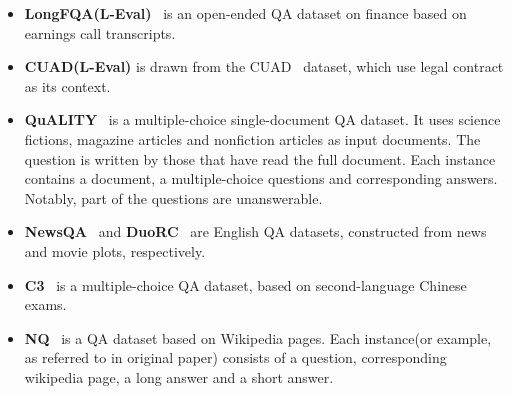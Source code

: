 \begin{itemize}[leftmargin=10pt]
    \item \textbf{LongFQA(L-Eval)}~\cite{an_l-eval:_2023} is an open-ended QA dataset on finance based on earnings call transcripts. 
    \item \textbf{CUAD(L-Eval)}\cite{an_l-eval:_2023} is drawn from the CUAD~\cite{hendrycks_cuad:_2021} dataset, which use legal contract as its context. 
    \item \textbf{QuALITY}~\cite{pang_quality_dataset:_2021} is a multiple-choice single-document QA dataset. It uses science fictions, magazine articles and nonfiction articles as input documents. The question is written by those that have read the full document. Each instance contains a document, a multiple-choice questions and corresponding answers. Notably, part of the questions are unanswerable. 
    \item \textbf{NewsQA}~\cite{kwan_m4le:_2023} and \textbf{DuoRC}~\cite{kwan_m4le:_2023} are English QA datasets, constructed from news and movie plots, respectively. 
    \item \textbf{C3}~\cite{kwan_m4le:_2023} is a multiple-choice QA dataset, based on second-language Chinese exams.  
    \item \textbf{NQ}~\cite{kwiatkowski_nq_2019} is a QA dataset based on Wikipedia pages. Each instance(or example, as referred to in original paper) consists of a question, corresponding wikipedia page, a long answer and a short answer. 
\end{itemize}




